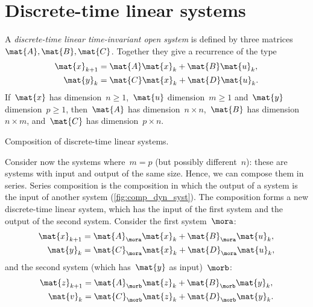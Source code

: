 
\section{Discrete-time linear systems}

\begin{definition}
    \label{def:discrete-time-linear-system}
    A \emph{discrete-time linear time-invariant open system} is defined by three matrices~$\mat{A},\mat{B},\mat{C}$.
    Together they give a recurrence of the type
    \begin{equation}
        \label{eq:discrete-time-dynamics}
        \begin{aligned}
            \mat{x}_{k+1} & =  \mat{A} \mat{x}_k + \mat{B} \mat{u}_k, \\
            \mat{y}_{k}   & =  \mat{C} \mat{x}_k + \mat{D} \mat{u}_k.
        \end{aligned}
    \end{equation}
    If~$\mat{x}$ has dimension~$n\geq1$,~$\mat{u}$ dimension~$m\geq1$ and~$\mat{y}$ dimension~$p\geq1$, then~$\mat{A}$ has dimension~$n \times n$,~$\mat{B}$ has dimension~$n \times m$, and~$\mat{C}$ has dimension~$p \times n$.
\end{definition}

\begin{marginfigure}
    \centering
    \caption{Composition of discrete-time linear systems.}
    \label{fig:comp_dyn_syst}
\end{marginfigure}

Consider now the systems where~$m=p$ (but possibly different~$n$):
these are systems with input and output of the same size.
Hence, we can compose them in series.
Series composition is the composition in which the output of a system is the input of another system (\cref{fig:comp_dyn_syst}).
The composition forms a new discrete-time linear system, which has the input of the first system and the output of the second system.
Consider the first system~$\mora$:
%
\begin{equation}
    \label{eq:dlin-1}
    \begin{aligned}
        \mat{x}_{k+1} & = \mat{A}_\mora \mat{x}_k + \mat{B}_\mora \mat{u}_k, \\
        \mat{y}_{k}   & = \mat{C}_\mora \mat{x}_k + \mat{D}_\mora \mat{u}_k,
    \end{aligned}
\end{equation}
%
and the second system (which has~$\mat{y}$ as input)~$\morb$:
%
\begin{equation}
    \label{eq:dlin-2}
    \begin{aligned}
        \mat{z}_{k+1} & = \mat{A}_\morb \mat{z}_k + \mat{B}_\morb \mat{y}_k, \\
        \mat{v}_{k}   & = \mat{C}_\morb \mat{z}_k+ \mat{D}_\morb \mat{y}_k.
    \end{aligned}
\end{equation}


